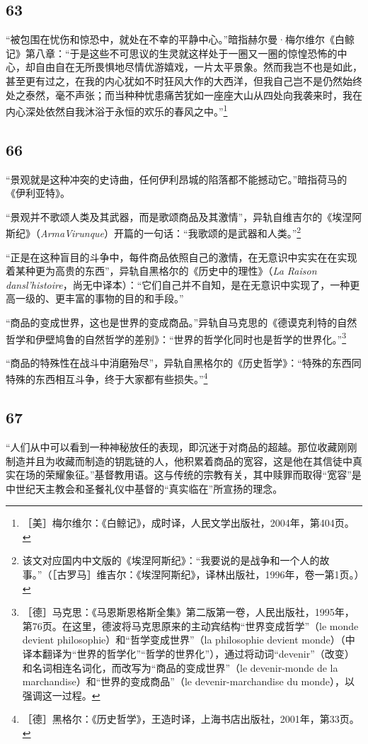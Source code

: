 \documentclass[fontset=fandol, a4paper, 12pt, openright]{ctexbook}
\begin{document}
\subsection*{63}
“被包围在忧伤和惊恐中，就处在不幸的平静中心。”暗指赫尔曼·梅尔维尔《白鲸记》第八章：“于是这些不可思议的生灵就这样处于一圈又一圈的惊惶恐怖的中心，却自由自在无所畏惧地尽情优游嬉戏，一片太平景象。然而我岂不也是如此，甚至更有过之，在我的内心犹如不时狂风大作的大西洋，但我自己岂不是仍然始终处之泰然，毫不声张；而当种种忧患痛苦犹如一座座大山从四处向我袭来时，我在内心深处依然自我沐浴于永恒的欢乐的春风之中。”\footnote{［美］梅尔维尔：《白鲸记》，成时译，人民文学出版社，2004年，第404页。}

\subsection*{66}
“景观就是这种冲突的史诗曲，任何伊利昂城的陷落都不能撼动它。”暗指荷马的《伊利亚特》。

“景观并不歌颂人类及其武器，而是歌颂商品及其激情”，异轨自维吉尔的《埃涅阿斯纪》（\textit{ArmaVirunque}）开篇的一句话：“我歌颂的是武器和人类。”\footnote{该文对应国内中文版的《埃涅阿斯纪》：“我要说的是战争和一个人的故事。”（［古罗马］维吉尔：《埃涅阿斯纪》，译林出版社，1996年，卷一第1页。）}

“正是在这种盲目的斗争中，每件商品依照自己的激情，在无意识中实实在在实现着某种更为高贵的东西”，异轨自黑格尔的《历史中的理性》（\textit{La Raison dansl'histoire}，尚无中译本）：“它们自己并不自知，是在无意识中实现了，一种更高一级的、更丰富的事物的目的和手段。”

“商品的变成世界，这也是世界的变成商品。”异轨自马克思的《德谟克利特的自然哲学和伊壁鸠鲁的自然哲学的差别》：“世界的哲学化同时也是哲学的世界化。”\footnote{［德］马克思：《马恩斯恩格斯全集》第二版第一卷，人民出版社，1995年，第76页。在这里，德波将马克思原来的主动宾结构“世界变成哲学”（le monde devient philosophie）和“哲学变成世界”（la philosophie devient monde）（中译本翻译为“世界的哲学化”“哲学的世界化”），通过将动词“devenir”（改变）和名词相连名词化，而改写为“商品的变成世界”（le devenir-monde de la marchandise）和“世界的变成商品”（le devenir-marchandise du monde），以强调这一过程。}

“商品的特殊性在战斗中消磨殆尽”，异轨自黑格尔的《历史哲学》：“特殊的东西同特殊的东西相互斗争，终于大家都有些损失。”\footnote{［德］黑格尔：《历史哲学》，王造时译，上海书店出版社，2001年，第33页。}

\subsection*{67}
“人们从中可以看到一种神秘放任的表现，即沉迷于对商品的超越。那位收藏刚刚制造并且为收藏而制造的钥匙链的人，他积累着商品的宽容，这是他在其信徒中真实在场的荣耀象征。”基督教用语。这与传统的宗教有关，其中赎罪而取得“宽容”是中世纪天主教会和圣餐礼仪中基督的“真实临在”所宣扬的理念。
\end{document}
